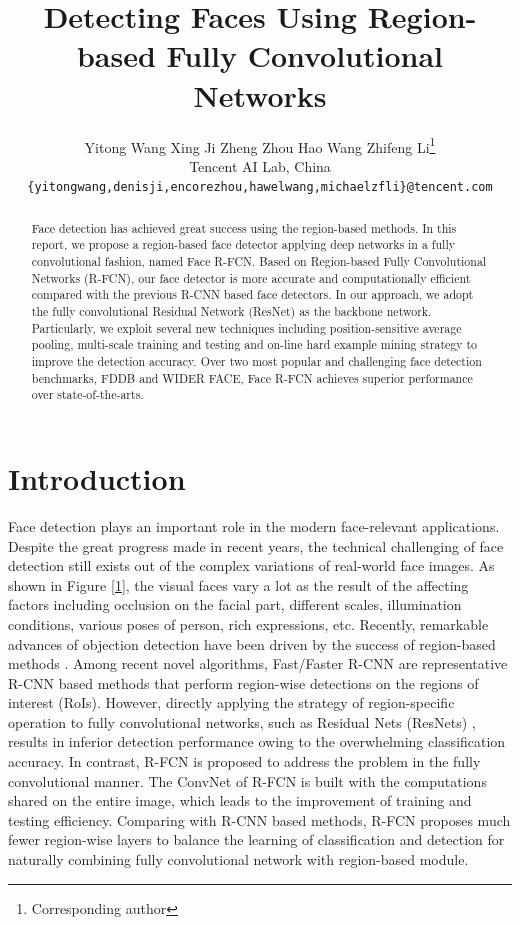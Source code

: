 \documentclass{article} %
\title{Detecting Faces Using Region-based Fully Convolutional Networks}
\author{
  Yitong Wang \quad Xing Ji \quad Zheng Zhou \quad Hao Wang \quad Zhifeng Li\thanks{Corresponding author}\\
  Tencent AI Lab, China\\
  \texttt{\{yitongwang,denisji,encorezhou,hawelwang,michaelzfli\}@tencent.com} \\
}
\begin{document}
\maketitle

\begin{abstract}

Face detection has achieved great success using the region-based methods.
In this report, we propose a region-based face detector applying deep networks in a fully convolutional fashion, named Face R-FCN. Based on Region-based Fully Convolutional Networks (R-FCN), our face detector is more accurate and computationally efficient compared with the previous R-CNN based face detectors. In our approach, we adopt the fully convolutional Residual Network (ResNet) as the backbone network. Particularly, we exploit several new techniques including position-sensitive average pooling, multi-scale training and testing and on-line hard example mining strategy to improve the detection accuracy. Over two most popular and challenging face detection benchmarks, FDDB and WIDER FACE, Face R-FCN achieves superior performance over state-of-the-arts.

\end{abstract}

\section{Introduction}
Face detection plays an important role in the modern face-relevant applications. Despite the great progress made in recent years, the technical challenging of face detection still exists out of the complex variations of real-world face images.
As shown in Figure \ref{1}, the visual faces vary a lot as the result of the affecting factors including occlusion on the facial part, different scales, illumination conditions, various poses of person, rich expressions, etc.
Recently, remarkable advances of objection detection have been driven by the success of region-based methods \cite{RCNNs,RCNN,FastRCNN,FasterRCNN}. Among recent novel algorithms, Fast/Faster R-CNN \cite{FastRCNN,FasterRCNN} are representative R-CNN based methods that perform region-wise detections on the regions of interest (RoIs). However, directly applying the strategy of region-specific operation to fully convolutional networks, such as Residual Nets (ResNets) \cite{ResNet101}, results in inferior detection performance owing to the overwhelming classification accuracy. In contrast, R-FCN \cite{RFCN} is proposed to address the problem in the fully convolutional manner.
The ConvNet of R-FCN is built with the computations shared on the entire image, which leads to the improvement of training and testing efficiency. Comparing with R-CNN based methods, R-FCN proposes much fewer region-wise layers to balance the learning of classification and detection for naturally combining fully convolutional network with region-based module.
\end{document}
